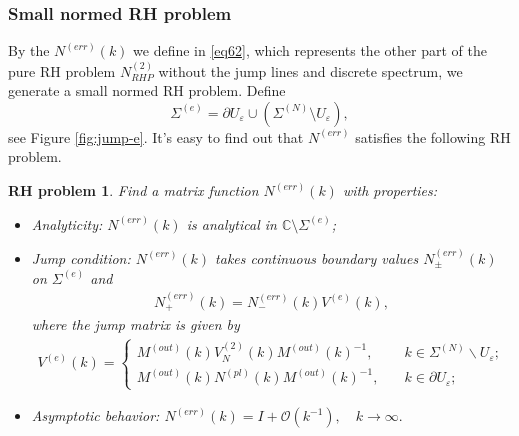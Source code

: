 \documentclass[11pt]{article}
\numberwithin{equation}{section}
\newtheorem{RHP}{RH problem}
\begin{document}
\subsubsection{Small normed RH problem}
By the $N^{(err)}(k)$ we define in \eqref{eq62}, which represents the other part of the pure RH problem $N^{(2)}_{RHP}$ without the jump lines and discrete spectrum, we generate a small normed RH problem.
Define
\begin{equation}
    \Sigma^{(e)}=\partial U_{\varepsilon}\cup\left(\Sigma^{(N)}\setminus U_{\varepsilon}\right),
\end{equation}
see Figure \ref{fig:jump-e}. It's easy to find out that $N^{(err)}$ satisfies the following RH problem.
\begin{RHP}
     Find    a matrix function  $N^{(err)}(k)$ with  properties:
          \begin{itemize}
          	\item  Analyticity: $N^{(err)}(k)$ is analytical in $\mathbb{C}\setminus \Sigma^{(e)}$;
          	\item Jump condition: $N^{(err)}(k)$  takes continuous boundary values $N^{(err)}_\pm(k)$ on $\Sigma^{(e)}$ and
          	\begin{align*}
          		N^{(err)}_{+}(k)=N^{(err)}_-(k)V^{(e)}(k),
          	\end{align*}
          	where the jump matrix is given by
           \begin{align*}
                V^{(e)}(k)= \begin{cases}
                   M^{(out)}(k)V^{(2)}_N(k)M^{(out)}(k)^{-1},\quad& k \in \Sigma^{(N)} \backslash U_\varepsilon;\\
                 M^{(out)}(k)N^{(pl)}(k)M^{(out)}(k)^{-1} , \quad &k \in \partial U_\varepsilon;
                \end{cases}
            \end{align*}
          	\item    Asymptotic behavior:   $N^{(err)}(k)=I+\mathcal{O}(k^{-1}),	\quad  k\to  \infty.$	

          \end{itemize}
\end{RHP}
\end{document}
